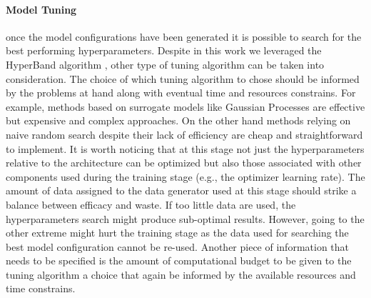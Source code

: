 \paragraph*{Model Tuning} once the model configurations have been generated it is possible to search for the best performing hyperparameters. Despite in this work we leveraged the HyperBand algorithm \cite{li2017hyperband}, other type of tuning algorithm can be taken into consideration.  The choice of which tuning algorithm to chose should be informed by the problems at hand along with eventual time and resources constrains. For example, methods based on surrogate models like Gaussian Processes \cite{bergstra2011algorithms} are effective but expensive and complex approaches. On the other hand methods relying on naive random search despite their lack of efficiency are cheap and straightforward to implement. It is worth noticing that at this stage not just the hyperparameters relative to the architecture can be optimized but also those associated with other components used during the training stage (e.g., the optimizer learning rate). The amount of data assigned to the data generator used at this stage should strike a balance between efficacy and waste. If too little data are used, the hyperparameters search might produce sub-optimal results. However, going to the other extreme might hurt the training stage as the data used for searching the best model configuration cannot be re-used. Another piece of information that needs to be specified is the amount of computational budget to be given to the tuning algorithm a choice that again be informed by the available resources and time constrains.

